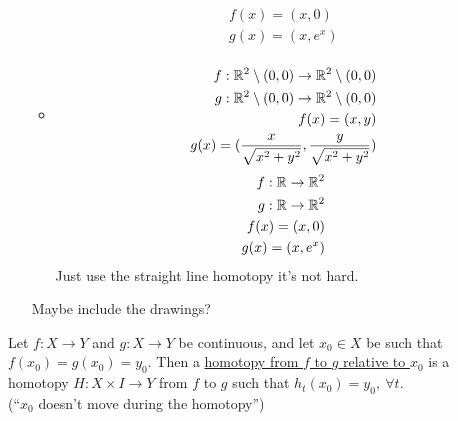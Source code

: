 \begin{itemize}
\begin{itemize}
\begin{align*}
                        f(x)=(x,0)\\
                        g(x)=(x,e^x)\\
                    \end{align*}
                \item
                    \begin{align*}
                        f: \mathbb{R}^2\setminus{(0,0)} \rightarrow \mathbb{R}^2\setminus{(0,0)}\\
                        g: \mathbb{R}^2\setminus{(0,0)} \rightarrow \mathbb{R}^2\setminus{(0,0)}\\
                        f(x)=(x,y)\\
                        g(x)=(\frac{x}{\sqrt{x^2+y^2}},\frac{y}{\sqrt{x^2+y^2}})\\
                    \end{align*}
                    \begin{align*}
                        f: \mathbb{R} \rightarrow \mathbb{R}^2\\
                        g: \mathbb{R} \rightarrow \mathbb{R}^2\\
                        f(x)=(x,0)\\
                        g(x)=(x,e^x)\\
                    \end{align*}
                    Just use the straight line homotopy it's not hard.
            \end{itemize}
            Maybe include the drawings?
    \end{itemize}
        \begin{definition}
            Let $f:X\rightarrow Y$ and $g: X\rightarrow Y$ be continuous,
            and let $x_0 \in X$ be such that $f(x_0)=g(x_0)=y_0$. Then a
            \underline{homotopy from $f$ to $g$ relative to $x_0$} is a homotopy $H:X\times I \rightarrow Y$
            from $f$ to $g$ such that $h_t(x_0)=y_0,\ \forall t$.\\
            (``$x_0$ doesn't move during the homotopy'')
        \end{definition}
